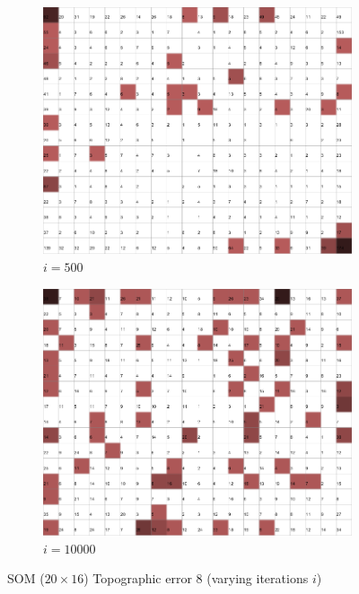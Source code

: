 \documentclass{acm_proc_article-sp}
\begin{document}
\begin{figure}
\begin{subfigure}[b]{0.24\linewidth}
    \end{subfigure}
    \begin{subfigure}[b]{0.24\linewidth}
        \includegraphics[width=\linewidth]{img/wine-newmid-topographic-error-i-500}
        \caption{$i=500$}
        \label{fig:wine-newmid-topographic-error-i-500}
    \end{subfigure}
    \begin{subfigure}[b]{0.24\linewidth}
        \includegraphics[width=\linewidth]{img/wine-newmid-topographic-error-i-10000}
        \caption{$i=10000$}
        \label{fig:wine-newmid-topographic-error-i-10000}
    \end{subfigure}
    \caption{SOM ($20\times16$) Topographic error 8 (varying iterations $i$)}
    \label{fig:wine-newmid-topographic-error-i}
\end{figure}
\end{document}
